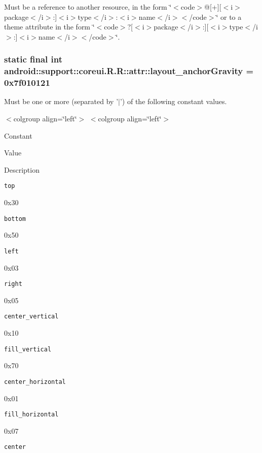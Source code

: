 Must be a reference to another resource, in the form \char`\"{}$<$code$>$@\mbox{[}+\mbox{]}\mbox{[}$<$i$>$package$<$/i$>$:\mbox{]}$<$i$>$type$<$/i$>$:$<$i$>$name$<$/i$>$$<$/code$>$\char`\"{} or to a theme attribute in the form \char`\"{}$<$code$>$?\mbox{[}$<$i$>$package$<$/i$>$:\mbox{]}\mbox{[}$<$i$>$type$<$/i$>$:\mbox{]}$<$i$>$name$<$/i$>$$<$/code$>$\char`\"{}. \hypertarget{classandroid_1_1support_1_1coreui_1_1_r_1_1attr_bcbb17bacb10c209f7cae6809f5754fb}{
\subsubsection[{layout\_\-anchorGravity}]{\setlength{\rightskip}{0pt plus 5cm}static final int android::support::coreui.R.R::attr::layout\_\-anchorGravity = 0x7f010121}}
\label{classandroid_1_1support_1_1coreui_1_1_r_1_1attr_bcbb17bacb10c209f7cae6809f5754fb}


Must be one or more (separated by '$|$') of the following constant values. \begin{TabularC}{0}
\hline
\end{TabularC}
$<$colgroup align=\char`\"{}left\char`\"{}$>$ $<$colgroup align=\char`\"{}left\char`\"{}$>$ 

Constant

Value

Description 

{\tt top}

0x30

{\tt bottom}

0x50

{\tt left}

0x03

{\tt right}

0x05

{\tt center\_\-vertical}

0x10

{\tt fill\_\-vertical}

0x70

{\tt center\_\-horizontal}

0x01

{\tt fill\_\-horizontal}

0x07

{\tt center}

